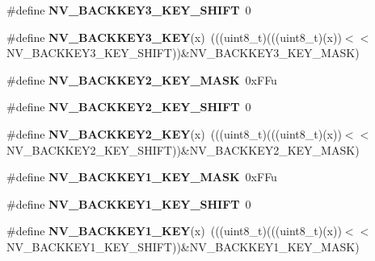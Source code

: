 \begin{DoxyCompactItemize}
\item 
\#define {\bfseries N\+V\+\_\+\+B\+A\+C\+K\+K\+E\+Y3\+\_\+\+K\+E\+Y\+\_\+\+S\+H\+I\+FT}~0\hypertarget{group__NV__Register__Masks_ga78b75e37d984596ddd9053d2125a78ff}{}\label{group__NV__Register__Masks_ga78b75e37d984596ddd9053d2125a78ff}

\item 
\#define {\bfseries N\+V\+\_\+\+B\+A\+C\+K\+K\+E\+Y3\+\_\+\+K\+EY}(x)~(((uint8\+\_\+t)(((uint8\+\_\+t)(x))$<$$<$N\+V\+\_\+\+B\+A\+C\+K\+K\+E\+Y3\+\_\+\+K\+E\+Y\+\_\+\+S\+H\+I\+FT))\&N\+V\+\_\+\+B\+A\+C\+K\+K\+E\+Y3\+\_\+\+K\+E\+Y\+\_\+\+M\+A\+SK)\hypertarget{group__NV__Register__Masks_ga2fa5913563629cd7c8b509cc87421687}{}\label{group__NV__Register__Masks_ga2fa5913563629cd7c8b509cc87421687}

\item 
\#define {\bfseries N\+V\+\_\+\+B\+A\+C\+K\+K\+E\+Y2\+\_\+\+K\+E\+Y\+\_\+\+M\+A\+SK}~0x\+F\+Fu\hypertarget{group__NV__Register__Masks_ga5bf8822b0b59a321d9b5c30eb1618704}{}\label{group__NV__Register__Masks_ga5bf8822b0b59a321d9b5c30eb1618704}

\item 
\#define {\bfseries N\+V\+\_\+\+B\+A\+C\+K\+K\+E\+Y2\+\_\+\+K\+E\+Y\+\_\+\+S\+H\+I\+FT}~0\hypertarget{group__NV__Register__Masks_ga408b1083508e784cba76d5be9b147a84}{}\label{group__NV__Register__Masks_ga408b1083508e784cba76d5be9b147a84}

\item 
\#define {\bfseries N\+V\+\_\+\+B\+A\+C\+K\+K\+E\+Y2\+\_\+\+K\+EY}(x)~(((uint8\+\_\+t)(((uint8\+\_\+t)(x))$<$$<$N\+V\+\_\+\+B\+A\+C\+K\+K\+E\+Y2\+\_\+\+K\+E\+Y\+\_\+\+S\+H\+I\+FT))\&N\+V\+\_\+\+B\+A\+C\+K\+K\+E\+Y2\+\_\+\+K\+E\+Y\+\_\+\+M\+A\+SK)\hypertarget{group__NV__Register__Masks_gaca7b47cbaa596b76f92f926f40dcc80a}{}\label{group__NV__Register__Masks_gaca7b47cbaa596b76f92f926f40dcc80a}

\item 
\#define {\bfseries N\+V\+\_\+\+B\+A\+C\+K\+K\+E\+Y1\+\_\+\+K\+E\+Y\+\_\+\+M\+A\+SK}~0x\+F\+Fu\hypertarget{group__NV__Register__Masks_ga6cd05d78b113df7f3cb0d11d29931666}{}\label{group__NV__Register__Masks_ga6cd05d78b113df7f3cb0d11d29931666}

\item 
\#define {\bfseries N\+V\+\_\+\+B\+A\+C\+K\+K\+E\+Y1\+\_\+\+K\+E\+Y\+\_\+\+S\+H\+I\+FT}~0\hypertarget{group__NV__Register__Masks_ga71418f17e11f902066ca404fbe473aef}{}\label{group__NV__Register__Masks_ga71418f17e11f902066ca404fbe473aef}

\item 
\#define {\bfseries N\+V\+\_\+\+B\+A\+C\+K\+K\+E\+Y1\+\_\+\+K\+EY}(x)~(((uint8\+\_\+t)(((uint8\+\_\+t)(x))$<$$<$N\+V\+\_\+\+B\+A\+C\+K\+K\+E\+Y1\+\_\+\+K\+E\+Y\+\_\+\+S\+H\+I\+FT))\&N\+V\+\_\+\+B\+A\+C\+K\+K\+E\+Y1\+\_\+\+K\+E\+Y\+\_\+\+M\+A\+SK)\hypertarget{group__NV__Register__Masks_gac336f640b5b887647407bd036aabb060}{}\label{group__NV__Register__Masks_gac336f640b5b887647407bd036aabb060}


\end{DoxyCompactItemize}
